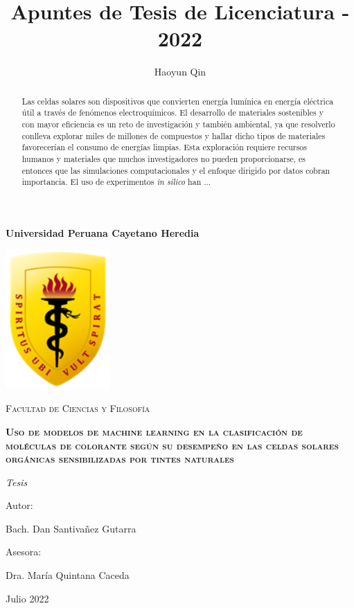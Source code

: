 \documentclass{article}
\title{Apuntes de Tesis de Licenciatura - 2022}
\author{Haoyun Qin}
\theoremstyle{mytheoremstyle}
\theoremstyle{mytheoremstyle}
\theoremstyle{myproblemstyle}
\begin{document}
    \begin{titlepage}
        \centering
        {\bfseries\LARGE Universidad Peruana Cayetano Heredia \par}
        \vspace{1cm}
        {\includegraphics[width=0.3\textwidth]{img/logo_escudo.png}\par}
        \vspace{1cm}
        {\scshape\Large Facultad de Ciencias y Filosofía \par}
        \vspace{1cm}
        {\bfseries\scshape\Large Uso de modelos de machine learning en la clasificación de moléculas de colorante según su desempeño en las celdas solares orgánicas sensibilizadas por tintes naturales \par}
        \vspace{1cm}
        {\itshape\Large Tesis \par}
        \vfill
        {\Large Autor: \par}
        {\Large Bach. Dan Santivañez Gutarra\par}
        \vfill
        {\Large Asesora: \par}
        {\Large Dra. María Quintana Caceda \par}
        \vfill
        {\Large Julio 2022 \par}
    \end{titlepage}

    \tableofcontents
    \newpage

    \begin{abstract}
        Las celdas solares son dispositivos que convierten energía lumínica en 
        energía eléctrica útil a través de fenómenos electroquímicos. El desarrollo
        de materiales sostenibles y con mayor eficiencia es un reto de investigación
        y también ambiental, ya que resolverlo conlleva explorar miles de millones de 
        compuestos y hallar dicho tipos de materiales favorecerían el consumo de 
        energías limpias. Esta exploración requiere recursos humanos y materiales que
        muchos investigadores no pueden proporcionarse, es entonces que las simulaciones
        computacionales y el enfoque dirigido por datos cobran importancia. El uso de 
        experimentos \textit{in silico} han ... 
    \end{abstract}
\end{document}
